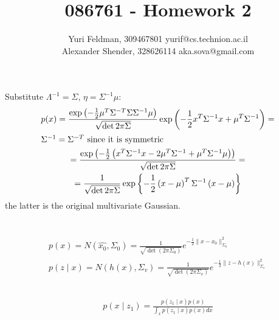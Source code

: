 \documentclass[a4paper]{scrreprt}
\title{086761 - Homework 2}
\author{Yuri Feldman, 309467801 yurif@cs.technion.ac.il \\
	    Alexander Shender, 328626114 aka.sova@gmail.com }
\begin{document}
\maketitle
\chapter{}
\section{}
Substitute $\Lambda^{-1} = \Sigma$, $\eta = \Sigma^{-1}\mu$:
\begin{gather}
	p(x) = 
	\frac{\exp\left(-\frac{1}{2}\mu^T\Sigma^{-T}\Sigma\Sigma^{-1}\mu\right)}{\sqrt{\det{2\pi\Sigma}}}
	\exp \left(-\frac{1}{2}x^T\Sigma^{-1}x+\mu^T\Sigma^{-1}\right) = \\
	\intertext{$\Sigma^{-1}=\Sigma^{-T}$ since it is symmetric}
	= 
	\frac{\exp\left(-\frac{1}{2}\left(x^T\Sigma^{-1}x - 2\mu^T\Sigma^{-1}  + 
	\mu^T\Sigma^{-1}\mu\right)\right)}{\sqrt{\det{2\pi\Sigma}}} 
	= \\
	= \frac{1}{\sqrt{\det{2\pi\Sigma}}}
	\exp\left\lbrace-\frac{1}{2}\left(x-\mu\right)^T\Sigma^{-1}\left(x-\mu\right)\right\rbrace
\end{gather}
the latter is the original multivariate Gaussian. 


\chapter{}
\section{}
\begin{gather}
	p(x) = N(\hat{x_0}, \Sigma_0) = 
	\frac{1}{\sqrt{\det\left(2\pi\Sigma_0\right)}} 
	e^{-\frac{1}{2}\parallel x-x_0 \parallel^2_{\Sigma_0}} \\
	p(z\mid x) = N(h(x), \Sigma_v) = 
	\frac{1}{\sqrt{\det\left(2\pi\Sigma_v\right)}} 
		e^{-\frac{1}{2}\parallel z-h(x) \parallel^2_{\Sigma_v}}
\end{gather}

\section{}
\begin{gather}
	p(x\mid z_1) = \frac{p(z_1\mid x ) p(x)}{\int_x p(z_1\mid x) p(x)dx}
\end{gather}
\end{document}

